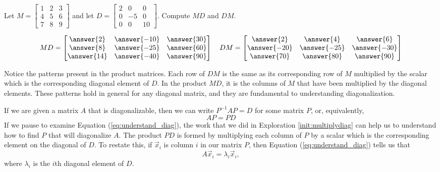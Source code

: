 \documentclass{ximera}
\begin{document}
\begin{exploration}\label{init:multiplydiag}
Let
$M =\begin{bmatrix}1 & 2 & 3\\ 4&5&6\\7&8&9\end{bmatrix}$ and let $D =\begin{bmatrix}2 & 0 & 0\\ 0&-5&0\\0&0&10\end{bmatrix}$.  Compute $MD$ and $DM$.

$$MD = \begin{bmatrix} \answer{2} & \answer{-10} & \answer{30}\\ \answer{8}&\answer{-25}&\answer{60}\\\answer{14}&\answer{-40}&\answer{90}\end{bmatrix} \quad DM= \begin{bmatrix} \answer{2} & \answer{4} & \answer{6}\\ \answer{-20}&\answer{-25}&\answer{-30}\\\answer{70}&\answer{80}&\answer{90}\end{bmatrix}$$

Notice the patterns present in the product matrices.  Each row of $DM$ is the same as its corresponding row of $M$ multiplied by the scalar which is the corresponding diagonal element of $D$.  In the product $MD$, it is the columns of $M$ that have been multiplied by the diagonal elements. These patterns hold in general for any diagonal matrix, and they are fundamental to understanding diagonalization.
\end{exploration}

  

If we are given a matrix $A$ that is diagonalizable, then we can write $P^{-1}AP=D$ for some matrix $P$, or, equivalently,
\begin{equation}\label{eq:understand_diag}
AP=PD   
\end{equation}
If we pause to examine Equation (\ref{eq:understand_diag}), the work that we did in Exploration  \ref{init:multiplydiag} can help us to understand how to find $P$ that will diagonalize $A$. The product $PD$ is formed by multiplying each column of $P$ by a scalar which is the corresponding element on the diagonal of $D$.  To restate this, if $\vec{x}_i$ is column $i$ in our matrix $P$, then Equation (\ref{eq:understand_diag}) tells us that 
\begin{equation}\label{eq:ev_ew_diag}
A \vec{x}_i = \lambda_i \vec{x}_i,  
\end{equation}
where $\lambda_i$ is the $i$th diagonal element of $D$.  
\end{document}
